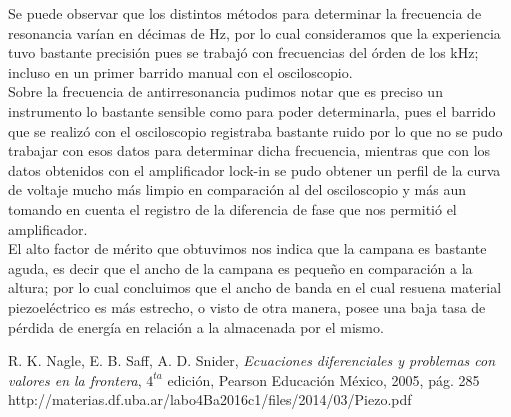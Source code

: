 \documentclass[twoside,twocolumn,a4paper]{article}
\begin{document}
Se puede observar que los distintos m\'etodos para determinar la frecuencia de resonancia var\'ian en d\'ecimas de Hz, por lo cual consideramos que la experiencia tuvo bastante precisi\'on pues se trabaj\'o con frecuencias del \'orden de los kHz; incluso en un primer barrido manual con el osciloscopio. \\

Sobre la frecuencia de antirresonancia pudimos notar que es preciso un instrumento lo bastante sensible como para poder determinarla, pues el barrido que se realiz\'o con el osciloscopio registraba bastante ruido por lo que no se pudo trabajar con esos datos para determinar dicha frecuencia, mientras que con los datos obtenidos con el amplificador lock-in se pudo obtener un perfil de la curva de voltaje mucho m\'as limpio en comparaci\'on al del osciloscopio y m\'as aun tomando en cuenta el registro de la diferencia de fase que nos permiti\'o el amplificador. \\

El alto factor de m\'erito que obtuvimos nos indica que la campana es bastante aguda, es decir que el ancho de la campana es peque\~no en comparaci\'on a la altura; por lo cual concluimos que el ancho de banda en el cual resuena material piezoel\'ectrico es m\'as estrecho, o visto de otra manera, posee una baja tasa de p\'erdida de energ\'ia en relaci\'on a la almacenada por el mismo.

\newpage
\begin{thebibliography}{99} %


 R. K. Nagle, E. B. Saff, A. D. Snider, \textit{Ecuaciones diferenciales y problemas con valores en la frontera}, $4^{ta}$ edici\'on, Pearson Educaci\'on M\'exico, 2005, p\'ag. 285
 http://materias.df.uba.ar/labo4Ba2016c1/files/2014/03/Piezo.pdf 
 
\end{thebibliography}


\end{document}
